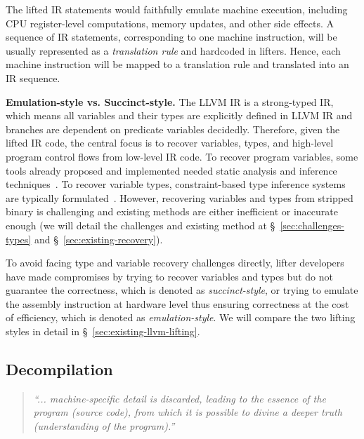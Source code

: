 The lifted IR statements would faithfully emulate machine execution, including
CPU register-level computations, memory updates, and other side effects. A
sequence of IR statements, corresponding to one machine instruction, will be
usually represented as a \textit{translation rule} and hardcoded in lifters.
Hence, each machine instruction will be mapped to a translation rule and
translated into an IR sequence.

\noindent \textbf{Emulation-style vs. Succinct-style.} The LLVM IR is a
strong-typed IR, which means all variables and their types are explicitly
defined in LLVM IR and branches are dependent on predicate variables
decidedly. Therefore, given the lifted IR code, the central focus is to
recover variables, types, and high-level program control flows from low-level
IR code. To recover program variables, some tools already proposed and
implemented needed static analysis and inference
techniques~\cite{anand2013compiler,balakrishnan2010wysinwyx,balakrishnan2007divine,reps2008improved,elwazeer2013scalable}.
To recover variable types, constraint-based type inference systems are
typically formulated~\cite{lee2011tie,noonan2016polymorphic}. However,
recovering variables and types from stripped binary is challenging and
existing methods are either inefficient or inaccurate enough (we will detail
the challenges and existing method at \S~\ref{sec:challenges-types} and \S~\ref{sec:existing-recovery}).

To avoid facing type and variable recovery challenges directly, lifter
developers have made compromises by trying to recover variables and types but
do not guarantee the correctness, which is denoted as \textit{succinct-style},
or trying to emulate the assembly instruction at hardware level thus ensuring
correctness at the cost of efficiency, which is denoted as \textit{emulation-style}.
We will compare the two lifting styles in detail in \S~\ref{sec:existing-llvm-lifting}.

\subsection{Decompilation} \label{subsec:background-decompilation}

\begin{quote}
\textit{``... machine-specific detail is discarded, leading to the essence of
the program (source code), from which it is possible to divine a deeper truth
(understanding of the program).''}~\cite{van2007static}
\end{quote}

